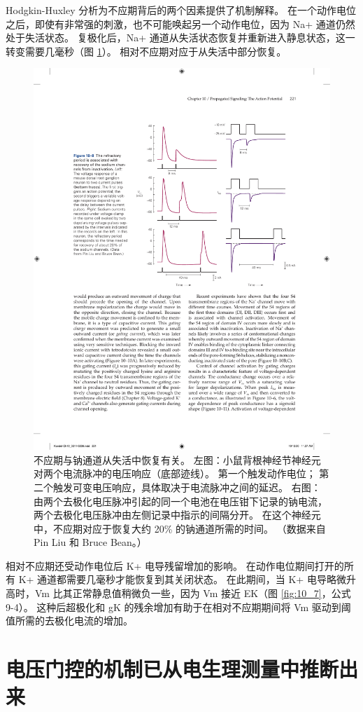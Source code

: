 Hodgkin-Huxley 分析为不应期背后的两个因素提供了机制解释。 
在一个动作电位之后，即使有非常强的刺激，也不可能唤起另一个动作电位，因为 Na+ 通道仍然处于失活状态。 
复极化后，Na+ 通道从失活状态恢复并重新进入静息状态，这一转变需要几毫秒（图 \ref{fig:10_8}）。 
相对不应期对应于从失活中部分恢复。

\begin{figure}[htbp]
	\centering
	\includegraphics[width=0.7\linewidth]{chap10/fig_10_8}
	\caption{不应期与钠通道从失活中恢复有关。 左图：小鼠背根神经节神经元对两个电流脉冲的电压响应（底部迹线）。 第一个触发动作电位； 第二个触发可变电压响应，具体取决于电流脉冲之间的延迟。 右图：由两个去极化电压脉冲引起的同一个电池在电压钳下记录的钠电流，两个去极化电压脉冲由左侧记录中指示的间隔分开。 在这个神经元中，不应期对应于恢复大约 20\% 的钠通道所需的时间。 （数据来自 Pin Liu 和 Bruce Bean。）}
	\label{fig:10_8}
\end{figure}


相对不应期还受动作电位后 K+ 电导残留增加的影响。 
在动作电位期间打开的所有 K+ 通道都需要几毫秒才能恢复到其关闭状态。 
在此期间，当 K+ 电导略微升高时，Vm 比其正常静息值稍微负一些，因为 Vm 接近 EK（图 \ref{fig:10_7}，公式 9-4）。 
这种后超极化和 gK 的残余增加有助于在相对不应期期间将 Vm 驱动到阈值所需的去极化电流的增加。




\section{电压门控的机制已从电生理测量中推断出来}


